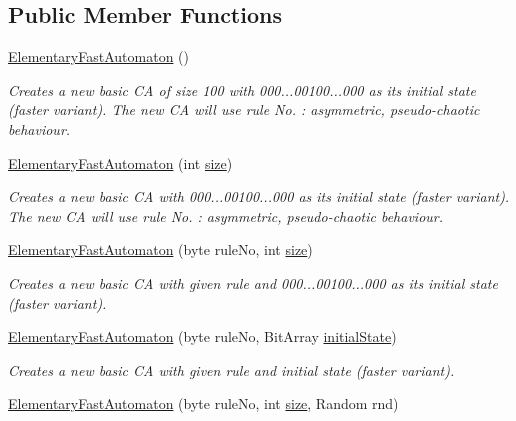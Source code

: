 \subsection*{Public Member Functions}
\begin{DoxyCompactItemize}
\item 
\hyperlink{class_cellular_1_1_elementary_fast_automaton_a523849592c63659176280e3b83c68deb}{Elementary\+Fast\+Automaton} ()
\begin{DoxyCompactList}\small\item\em Creates a new basic C\+A of size 100 with 000...00100...000 as its initial state (faster variant). The new C\+A will use rule No. \+: asymmetric, pseudo-\/chaotic behaviour. \end{DoxyCompactList}\item 
\hyperlink{class_cellular_1_1_elementary_fast_automaton_a441c7443274fb097097cd25605bcf2a4}{Elementary\+Fast\+Automaton} (int \hyperlink{class_cellular_1_1_automaton1_d_a915129ccf0f1e7092844c99ce6a28e5b}{size})
\begin{DoxyCompactList}\small\item\em Creates a new basic C\+A with 000...00100...000 as its initial state (faster variant). The new C\+A will use rule No. \+: asymmetric, pseudo-\/chaotic behaviour. \end{DoxyCompactList}\item 
\hyperlink{class_cellular_1_1_elementary_fast_automaton_ae2e62d7dd0087766f36ccd9b430ecbbe}{Elementary\+Fast\+Automaton} (byte rule\+No, int \hyperlink{class_cellular_1_1_automaton1_d_a915129ccf0f1e7092844c99ce6a28e5b}{size})
\begin{DoxyCompactList}\small\item\em Creates a new basic C\+A with given rule and 000...00100...000 as its initial state (faster variant). \end{DoxyCompactList}\item 
\hyperlink{class_cellular_1_1_elementary_fast_automaton_a2d068af48fc2d4cf58ab01893e4087d9}{Elementary\+Fast\+Automaton} (byte rule\+No, Bit\+Array \hyperlink{all__1_8js_ae8b87ff4be2ae1dd5267342795263360}{initial\+State})
\begin{DoxyCompactList}\small\item\em Creates a new basic C\+A with given rule and initial state (faster variant). \end{DoxyCompactList}\item 
\hyperlink{class_cellular_1_1_elementary_fast_automaton_aa3e99cfefec68dd7764de5778397760d}{Elementary\+Fast\+Automaton} (byte rule\+No, int \hyperlink{class_cellular_1_1_automaton1_d_a915129ccf0f1e7092844c99ce6a28e5b}{size}, Random rnd)

\end{DoxyCompactItemize}
